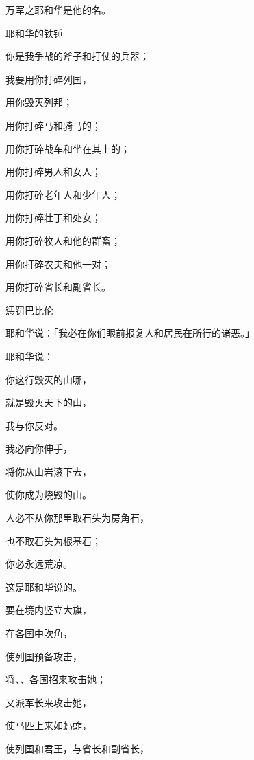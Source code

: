 {\par }{\Q 万军之耶和华是他的名。
\par }{\SH 耶和华的铁锤
\par }{\Q {}你是我争战的斧子和打仗的兵器；
\par }{\Q 我要用你打碎列国，
\par }{\Q 用你毁灭列邦；
\par }{\Q {}用你打碎马和骑马的；
\par }{\Q 用你打碎战车和坐在其上的；
\par }{\Q {}用你打碎男人和女人；
\par }{\Q 用你打碎老年人和少年人；
\par }{\Q 用你打碎壮丁和处女；
\par }{\Q {}用你打碎牧人和他的群畜；
\par }{\Q 用你打碎农夫和他一对{}；
\par }{\Q 用你打碎省长和副省长。
\par }{\BB \par }{\SH 惩罚巴比伦
\par }{\PP {}耶和华说：「我必在你们眼前报复{}人和{}居民在{}所行的诸恶。」
\par }{\Q {}耶和华说：
\par }{\Q 你这行毁灭的山哪，
\par }{\Q 就是毁灭天下的山，
\par }{\Q 我与你反对。
\par }{\Q 我必向你伸手，
\par }{\Q 将你从山岩滚下去，
\par }{\Q 使你成为烧毁的山。
\par }{\Q {}人必不从你那里取石头为房角石，
\par }{\Q 也不取石头为根基石；
\par }{\Q 你必永远荒凉。
\par }{\Q 这是耶和华说的。
\par }{\BB \par }{\Q {}要在境内竖立大旗，
\par }{\Q 在各国中吹角，
\par }{\Q 使列国预备攻击{}，
\par }{\Q 将{}、{}、{}各国招来攻击她；
\par }{\Q 又派军长来攻击她，
\par }{\Q 使马匹上来如蚂蚱，
\par }{\Q {}使列国和{}君王，与省长和副省长，
}
